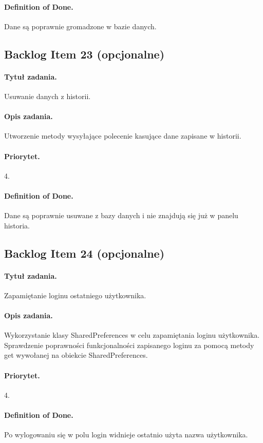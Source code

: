 \documentclass[a4paper]{article}
\begin{document}
\paragraph{Definition of Done.} Dane są poprawnie gromadzone w bazie danych.

\subsection{Backlog Item 23 (opcjonalne)}
\paragraph{Tytuł zadania.} Usuwanie danych z historii.
\paragraph{Opis zadania.} Utworzenie metody wysyłające polecenie kasujące dane zapisane w historii.
\paragraph{Priorytet.} 4.
\paragraph{Definition of Done.} Dane są poprawnie usuwane z bazy danych i nie znajdują się już w panelu historia.

\subsection{Backlog Item 24 (opcjonalne)}
\paragraph{Tytuł zadania.} Zapamiętanie loginu ostatniego użytkownika.
\paragraph{Opis zadania.} Wykorzystanie klasy SharedPreferences w celu zapamiętania loginu użytkownika. Sprawdzenie poprawności funkcjonalności zapisanego loginu za pomocą metody get wywołanej na obiekcie SharedPreferences.
\paragraph{Priorytet.} 4.
\paragraph{Definition of Done.} Po wylogowaniu się w polu login widnieje ostatnio użyta nazwa użytkownika.
\end{document}
